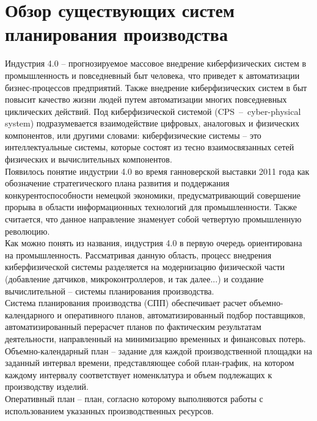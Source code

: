 \chapter{Обзор существующих систем планирования производства}

\hspace{\parindent} Индустрия 4.0 -- прогнозируемое массовое внедрение киберфизических систем в промышленность и повседневный быт человека, что приведет к автоматизации бизнес-процессов предприятий.
Также внедрение киберфизических систем в быт повысит качество жизни людей путем автоматизации многих повседневных циклических действий.
Под киберфизической системой (CPS~--~cyber-physical system) подразумевается взаимодействие цифровых, аналоговых и физических компонентов, или другими словами: киберфизические системы -- это интеллектуальные системы, которые состоят из тесно взаимосвязанных сетей физических и вычислительных компонентов\cite{nist}.\\
\indent Появилось понятие индустрии 4.0 во время ганноверской выставки 2011 года как обозначение стратегического плана развития и поддержания конкурентоспособности немецкой экономики, предусматривающий совершение прорыва в области информационных технологий для промышленности.
Также считается, что данное направление знаменует собой четвертую промышленную революцию\cite{industry}.\\
\indent Как можно понять из названия, индустрия 4.0 в первую очередь ориентирована на промышленность.
Рассматривая данную область, процесс внедрения киберфизической системы разделяется на модернизацию физической части (добавление датчиков, микроконтроллеров, и так далее...) и создание вычислительной -- системы планирования производства.\\
\indent Система планирования производства (СПП) обеспечивает расчет объемно-календарного и оперативного планов, автоматизированный подбор поставщиков, автоматизированный перерасчет планов по фактическим результатам деятельности, направленный на минимизацию временных и финансовых потерь.\\
\indent Объемно-календарный план -- задание для каждой производственной площадки на заданный интервал времени, представляющее собой план-график, на котором каждому интервалу соответствует номенклатура и объем подлежащих к производству изделий\cite{niokr}.\\
\indent Оперативный план -- план, согласно которому выполняются работы с использованием указанных производственных ресурсов.
